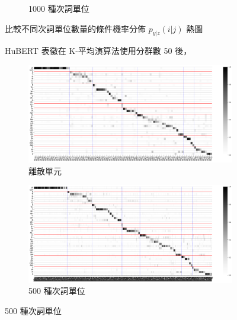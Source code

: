{{{\begin{figure}
\begin{subfigure}{\textwidth}
                 \caption{1000 種次詞單位}
                 \label{fig:hub-u050-ap1000-givenunit-byphn}
             \end{subfigure}

             \caption{HuBERT 表徵在 K-平均演算法使用分群數 50 後，}
             比較不同次詞單位數量的條件機率分佈 $p_{y|z}(i | j)$ 熱圖
             \label{fig:hub-u050-comparisons}
        \end{figure}
    }
    {
        \newcommand{\tempwidth}[0]{0.8\linewidth}
        \begin{figure}
             \centering
             \begin{subfigure}{\textwidth}
                 \centering
                 \includegraphics[width=\tempwidth]{feasiblefigs/ch4figs/hub-u100-ap0000-givenunit-byphn.png}
                 \caption{離散單元}
                 \label{fig:hub-u100-ap0000-givenunit-byphn}
             \end{subfigure}
             \vfill
             \begin{subfigure}{\textwidth}
                 \centering
                 \includegraphics[width=\tempwidth]{feasiblefigs/ch4figs/hub-u100-ap0500-givenunit-byphn.png}
                 \caption{500 種次詞單位}
                 \label{fig:hub-u100-ap0500-givenunit-byphn}
             \end{subfigure}

\end{figure}}}}
